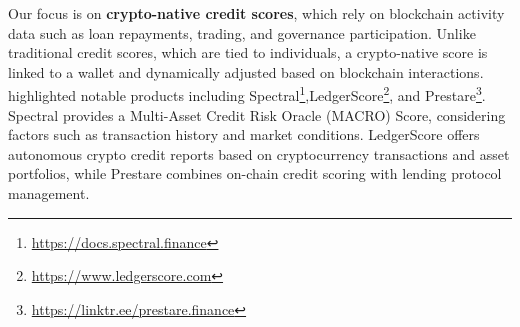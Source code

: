 \documentclass[runningheads]{llncs}
\begin{document}
{%
Our focus is on \textbf{crypto-native credit scores}, which rely on blockchain activity data such as loan repayments, trading, and governance participation. Unlike traditional credit scores, which are tied to individuals, a crypto-native score is linked to a wallet and dynamically adjusted based on blockchain interactions. \citeauthor{packin2023crypto}~\cite{packin2023crypto} highlighted notable products including Spectral\footnote{\href{https://docs.spectral.finance/}{https://docs.spectral.finance}},LedgerScore\footnote{\href{https://www.ledgerscore.com/}{https://www.ledgerscore.com}}, and Prestare\footnote{\href{https://linktr.ee/prestare.finance}{https://linktr.ee/prestare.finance}}. Spectral provides a Multi-Asset Credit Risk Oracle (MACRO) Score, considering factors such as transaction history and market conditions. LedgerScore offers autonomous crypto credit reports based on cryptocurrency transactions and asset portfolios, while Prestare combines on-chain credit scoring with lending protocol management.


}
\end{document}
